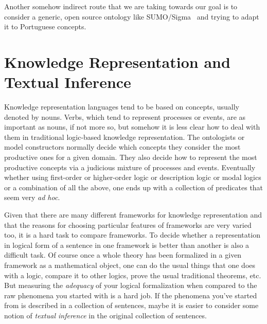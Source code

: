 \documentclass{article}
\begin{document}
Another somehow indirect route that we are taking towards our goal is
to consider a generic, open source ontology like
SUMO/Sigma~\cite{sumo} and trying to adapt it to Portuguese concepts.

\section{Knowledge Representation and Textual Inference}\label{til}


Knowledge representation languages tend to be based on concepts,
usually denoted by nouns. Verbs, which tend to represent processes or
events, are as important as nouns, if not more so, but somehow it is
less clear how to deal with them in traditional logic-based knowledge
representation. The ontologists or model constructors normally decide
which concepts they consider the most productive ones for a given
domain. They also decide how to represent the most productive concepts
via a judicious mixture of processes and events. Eventually whether
using first-order or higher-order logic or description logic or modal
logics or a combination of all the above, one ends up with a
collection of predicates that seem very {\em ad hoc}.

Given that there are many different frameworks for knowledge
representation and that the reasons for choosing particular features
of frameworks are very varied too, it is a hard task to compare
frameworks. To decide whether a representation in logical form of a
sentence in one framework is better than another is also a difficult
task. Of course once a whole theory has been formalized in a given
framework as a mathematical object, one can do the usual things that
one does with a logic, compare it to other logics, prove the usual
traditional theorems, etc. But measuring the {\em adequacy} of your
logical formalization when compared to the raw phenomena you started
with is a hard job. If the phenomena you've started from is described
in a collection of sentences, maybe it is easier to consider some
notion of {\em textual inference} in the original collection of
sentences.
\end{document}
